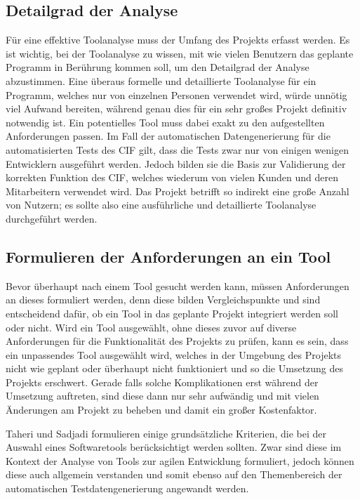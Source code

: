 \subsection{Detailgrad der Analyse}\label{toolanalysedetail}
Für eine effektive Toolanalyse muss der Umfang des Projekts erfasst werden. Es ist wichtig, bei der Toolanalyse zu wissen, mit wie vielen Benutzern das geplante Programm in Berührung kommen soll, um den Detailgrad der Analyse abzustimmen. Eine überaus formelle und detaillierte Toolanalyse für ein Programm, welches nur von einzelnen Personen verwendet wird, würde unnötig viel Aufwand bereiten, während genau dies für ein sehr großes Projekt definitiv notwendig ist. Ein potentielles Tool muss dabei exakt zu den aufgestellten Anforderungen passen. \cite[S. 249]{fewster:1999} Im Fall der automatischen Datengenerierung für die automatisierten Tests des \ac{CIF} gilt, dass die Tests zwar nur von einigen wenigen Entwicklern ausgeführt werden. Jedoch bilden sie die Basis zur Validierung der korrekten Funktion des \ac{CIF}, welches wiederum von vielen Kunden und deren Mitarbeitern verwendet wird. Das Projekt betrifft so indirekt eine große Anzahl von Nutzern; es sollte also eine ausführliche und detaillierte Toolanalyse durchgeführt werden.

\subsection{Formulieren der Anforderungen an ein Tool}\label{toolanalyseanforderungen}
Bevor überhaupt nach einem Tool gesucht werden kann, müssen Anforderungen an dieses formuliert werden, denn diese bilden Vergleichspunkte und sind entscheidend dafür, ob ein Tool in das geplante Projekt integriert werden soll oder nicht. Wird ein Tool ausgewählt, ohne dieses zuvor auf diverse Anforderungen für die Funktionalität des Projekts zu prüfen, kann es sein, dass ein unpassendes Tool ausgewählt wird, welches in der Umgebung des Projekts nicht wie geplant oder überhaupt nicht funktioniert und so die Umsetzung des Projekts erschwert. \cite[S. 249]{fewster:1999} Gerade falls solche Komplikationen erst während der Umsetzung auftreten, sind diese dann nur sehr aufwändig und mit vielen Änderungen am Projekt zu beheben und damit ein großer Kostenfaktor.

Taheri und Sadjadi formulieren einige grundsätzliche Kriterien, die bei der Auswahl eines Softwaretools berücksichtigt werden sollten. Zwar sind diese im Kontext der Analyse von Tools zur agilen Entwicklung formuliert, jedoch können diese auch allgemein verstanden und somit ebenso auf den Themenbereich der automatischen Testdatengenerierung angewandt werden.

